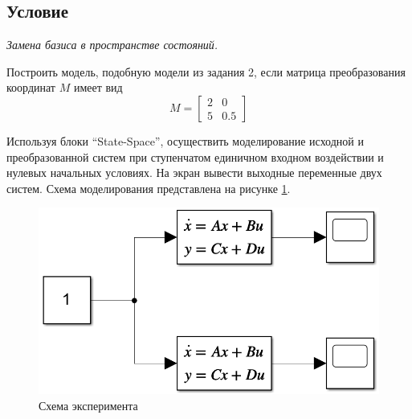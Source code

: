 \documentclass[a4paper, 12pt]{article}
\begin{document}
    \subsection{Условие}
    \textit{Замена базиса в пространстве состояний.}
    \begin{compactitem}
    \item Построить модель, подобную модели из задания 2, если матрица преобразования координат $M$ имеет вид
    $$M=\begin{bmatrix}
        2 & 0\\
        5 & 0.5
    \end{bmatrix}$$
    \item Используя блоки ``State-Space'', осуществить моделирование исходной и
    преобразованной систем при ступенчатом единичном входном воздействии и нулевых
    начальных условиях. На экран вывести выходные переменные двух систем. Схема
    моделирования представлена на рисунке \ref{fig:scheme3}.
    \begin{figure}[H]
        \centering
        \includegraphics[scale=0.5]{scheme3.png}
        \captionsetup{skip=0pt}
        \caption{Схема эксперимента}
        \label{fig:scheme3}
    \end{figure}
    \end{compactitem}
\end{document}
